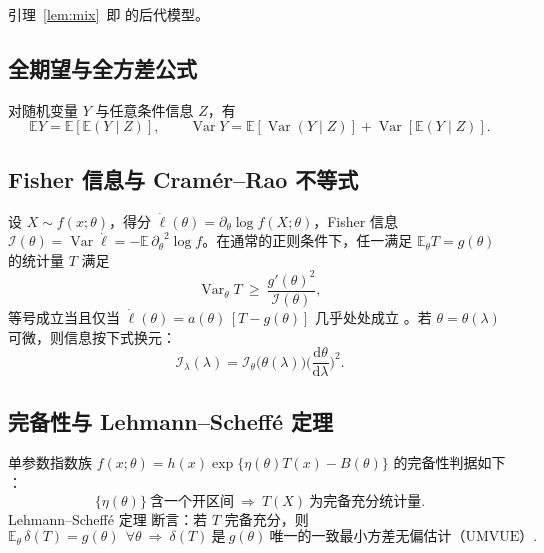 \documentclass[fontset=none,11pt,a4paper,fleqn]{ctexart}
\numberwithin{equation}{section}
\theoremstyle{zhthm}
\theoremstyle{zhrem}
\newcommand{\E}{\mathbb{E}}
\newcommand{\Var}{\operatorname{Var}}
\begin{document}
引理~\ref{lem:mix}~即 \citet{lloydsmith2005superspreading} 的后代模型。

\subsection{全期望与全方差公式}

对随机变量 $Y$ 与任意条件信息 $Z$，有
\begin{equation}
\E Y=\E[\E(Y\mid Z)],\qquad
\Var Y=\E[\Var(Y\mid Z)]+\Var[\E(Y\mid Z)].
\tag{P6}
\end{equation}

\subsection{Fisher 信息与 Cramér--Rao 不等式}

设 $X\sim f(x;\theta)$，得分 $\dot\ell(\theta)=\partial_\theta\log f(X;\theta)$，Fisher 信息 $\mathcal I(\theta)=\Var\dot\ell=-\E\,{\partial_\theta}^2\log f$。在通常的正则条件下，任一满足 $\E_\theta T=g(\theta)$ 的统计量 $T$ 满足
\begin{equation}
\Var_\theta T\ \ge\ \frac{g'(\theta)^2}{\mathcal I(\theta)},
\tag{P7}
\end{equation}
等号成立当且仅当 $\dot\ell(\theta)=a(\theta)\,[T-g(\theta)]$ 几乎处处成立 \citep{lehmann1998theory}。若 $\theta=\theta(\lambda)$ 可微，则信息按下式换元：
\begin{equation}
\mathcal I_\lambda(\lambda)=\mathcal I_\theta\big(\theta(\lambda)\big)\Big(\frac{\mathrm d\theta}{\mathrm d\lambda}\Big)^2.
\tag{P8}
\end{equation}

\subsection{完备性与 Lehmann--Scheffé 定理}

单参数指数族 $f(x;\theta)=h(x)\exp\{\eta(\theta)T(x)-B(\theta)\}$ 的完备性判据如下 \citep{lehmann2005testing}：
\begin{equation}
\{\eta(\theta)\}\ \text{含一个开区间}\ \Longrightarrow\ T(X)\ \text{为完备充分统计量}.
\tag{P9}
\end{equation}
Lehmann--Scheffé 定理 \citep{lehmann1998theory} 断言：若 $T$ 完备充分，则
\begin{equation}
\E_\theta\,\delta(T)=g(\theta)\ \ \forall\theta\ \Longrightarrow\ \delta(T)\ \text{是}\ g(\theta)\ \text{唯一的一致最小方差无偏估计（UMVUE）}.
\tag{P10}
\end{equation}
\end{document}
